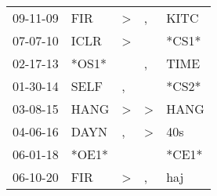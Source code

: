\begin{supertabular}{lllll}
 09-11-09 &    FIR &  \textgreater &                , &   KITC \\
 07-07-10 &   ICLR &  \textgreater &                  &  *CS1* \\
 02-17-13 &  *OS1* &               &                , &   TIME \\
 01-30-14 &   SELF &             , &                  &  *CS2* \\
 03-08-15 &   HANG &  \textgreater &     \textgreater &   HANG \\
 04-06-16 &   DAYN &             , &     \textgreater &    40s \\
 06-01-18 &  *OE1* &               &                  &  *CE1* \\
 06-10-20 &    FIR &  \textgreater &                , &    haj \\
\end{supertabular}
